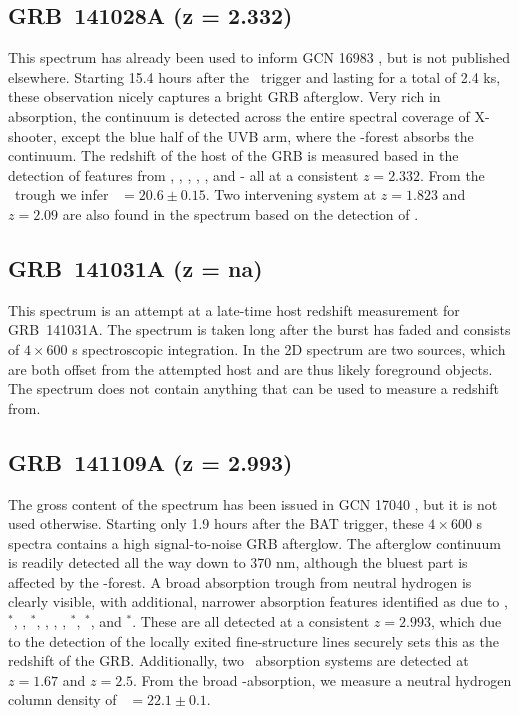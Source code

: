 \documentclass{aa}    %
\begin{document}
\subsection{GRB~141028A (z = 2.332)}\label{141028}

This spectrum has already been used to inform GCN 16983 \citep{GCN16983}, but is
not published elsewhere. Starting 15.4 hours after the \swift~trigger and
lasting for a total of 2.4 ks, these observation nicely captures a bright GRB
afterglow. Very rich in absorption, the continuum is detected across the entire
spectral coverage of X-shooter, except the blue half of the UVB arm, where the
\lya-forest absorbs the continuum. The redshift of the host of the GRB is
measured based in the detection of features from \lya, \SIii, \civ, \cii, \feii,
and \mgii - all at a consistent $z = 2.332$. From the \lya~trough we infer
\nh~$=20.6 \pm 0.15$. Two intervening system at $z = 1.823$ and $z = 2.09$ are
also found in the spectrum based on the detection of \civ.

\subsection{GRB~141031A  (z = na)}	\label{141031}

This spectrum is an attempt at a late-time host redshift measurement for
GRB~141031A. The spectrum is taken long after the burst has faded and consists
of $4\times600$ s spectroscopic integration. In the 2D spectrum are two sources,
which are both offset from the attempted host and are thus likely foreground
objects. The spectrum does not contain anything that can be used to measure a
redshift from.

\subsection{GRB~141109A (z = 2.993)}\label{141109}

The gross content of the spectrum has been issued in GCN 17040 \citep{GCN17040},
but it is not used otherwise. Starting only 1.9 hours after the BAT trigger,
these $4\times600$ s spectra contains a high signal-to-noise GRB afterglow. The
afterglow continuum is readily detected all the way down to 370 nm, although
the bluest part is affected by the \lya-forest. A broad absorption trough from
neutral hydrogen is clearly visible, with additional, narrower absorption
features identified as due to \SIii, \SIii$^*$, \cii, \cii$^*$, \SIiv, \civ,
\feii, \feii$^*$, \oi$^*$, and \nii$^*$. These are all detected at a consistent
$z = 2.993$, which due to the detection of the locally exited fine-structure
lines securely sets this as the redshift of the GRB. Additionally, two
\mgii~absorption systems are detected at $z = 1.67$ and $z=2.5$. From the broad
\lya-absorption, we measure a neutral hydrogen column density of \nh~$=22.1 \pm
0.1$.
\end{document}

